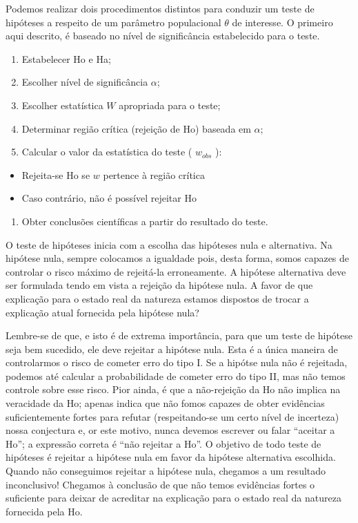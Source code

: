 \documentclass[
]{book}
\providecommand{\tightlist}{%
  \setlength{\itemsep}{0pt}\setlength{\parskip}{0pt}}
\theoremstyle{definition}
\theoremstyle{definition}
\theoremstyle{definition}
\theoremstyle{remark}
\begin{document}
Podemos realizar dois procedimentos distintos para conduzir um teste de hipóteses a respeito de um parâmetro populacional \(\theta\) de interesse. O primeiro aqui descrito, é baseado no nível de significância estabelecido para o teste.

\begin{enumerate}
\def\labelenumi{\arabic{enumi})}
\item
  Estabelecer Ho e Ha;
\item
  Escolher nível de significância \(\alpha\);
\item
  Escolher estatística \(W\) apropriada para o teste;
\item
  Determinar região crítica (rejeição de Ho) baseada em \(\alpha\);
\item
  Calcular o valor da estatística do teste ( \(w_{obs}\) ):\\
\end{enumerate}

\begin{itemize}
\tightlist
\item
  Rejeita-se Ho se \(w\) pertence à região crítica\\
\item
  Caso contrário, não é possível rejeitar Ho
\end{itemize}

\begin{enumerate}
\def\labelenumi{\arabic{enumi})}
\setcounter{enumi}{5}
\tightlist
\item
  Obter conclusões científicas a partir do resultado do teste.
\end{enumerate}

O teste de hipóteses inicia com a escolha das hipóteses nula e alternativa. Na hipótese nula, sempre colocamos a igualdade pois, desta forma, somos capazes de controlar o risco máximo de rejeitá-la erroneamente. A hipótese alternativa deve ser formulada tendo em vista a rejeição da hipótese nula. A favor de que explicação para o estado real da natureza estamos dispostos de trocar a explicação atual fornecida pela hipótese nula?

Lembre-se de que, e isto é de extrema importância, para que um teste de hipótese seja bem sucedido, ele deve rejeitar a hipótese nula. Esta é a única maneira de controlarmos o risco de cometer erro do tipo I. Se a hipótse nula não é rejeitada, podemos até calcular a probabilidade de cometer erro do tipo II, mas não temos controle sobre esse risco. Pior ainda, é que a não-rejeição da Ho não implica na veracidade da Ho; apenas indica que não fomos capazes de obter evidências suficientemente fortes para refutar (respeitando-se um certo nível de incerteza) nossa conjectura e, or este motivo, nunca devemos escrever ou falar ``aceitar a Ho''; a expressão correta é ``não rejeitar a Ho''. O objetivo de todo teste de hipóteses é rejeitar a hipótese nula em favor da hipótese alternativa escolhida. Quando não conseguimos rejeitar a hipótese nula, chegamos a um resultado inconclusivo! Chegamos à conclusão de que não temos evidências fortes o suficiente para deixar de acreditar na explicação para o estado real da natureza fornecida pela Ho.
\end{document}
